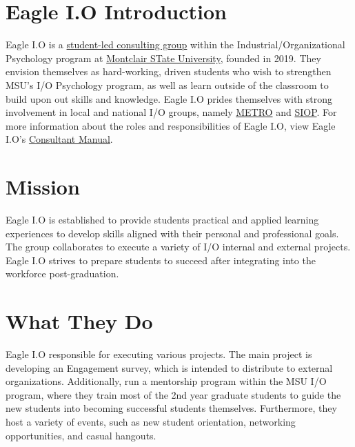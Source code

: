 \documentclass[
]{book}
\begin{document}
\hypertarget{eagle-i.o-introduction}{%
\section{Eagle I.O Introduction}\label{eagle-i.o-introduction}}

Eagle I.O is a \href{https://eagle-io.weebly.com/}{student-led consulting group} within the Industrial/Organizational Psychology program at \href{https://www.montclair.edu/psychology/graduate-programs/industrial-organizational-psychology/}{Montclair STate University}, founded in 2019. They envision themselves as hard-working, driven students who wish to strengthen MSU's I/O Psychology program, as well as learn outside of the classroom to build upon out skills and knowledge. Eagle I.O prides themselves with strong involvement in local and national I/O groups, namely \href{https://metroapppsych.com/}{METRO} and \href{https://www.siop.org/}{SIOP}. For more information about the roles and responsibilities of Eagle I.O, view Eagle I.O's \href{https://bookdown.org/kulasj/eagleiomanual/}{Consultant Manual}.

\hypertarget{mission}{%
\section{Mission}\label{mission}}

Eagle I.O is established to provide students practical and applied learning experiences to develop skills aligned with their personal and professional goals. The group collaborates to execute a variety of I/O internal and external projects. Eagle I.O strives to prepare students to succeed after integrating into the workforce post-graduation.

\hypertarget{what-they-do}{%
\section{What They Do}\label{what-they-do}}

Eagle I.O responsible for executing various projects. The main project is developing an Engagement survey, which is intended to distribute to external organizations. Additionally, run a mentorship program within the MSU I/O program, where they train most of the 2nd year graduate students to guide the new students into becoming successful students themselves. Furthermore, they host a variety of events, such as new student orientation, networking opportunities, and casual hangouts.
\end{document}
